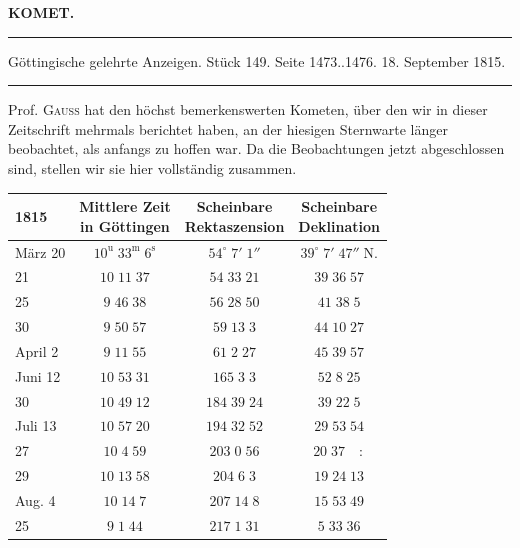 \clearpage{}\hypertarget{native-394-lower}{}\label{native-394-lower}
\begin{center}\textbf{KOMET.}\par\vspace{4pt}\hrule\vspace{4pt}\fontsize{10}{12}\selectfont Göttingische gelehrte Anzeigen. Stück 149. Seite 1473..1476. 18. September 1815.\par\vspace{4pt}\hrule\vspace{4pt}\end{center}

\par\indent Prof. \textsc{Gauss} hat den höchst bemerkenswerten Kometen, über den wir in dieser Zeitschrift mehrmals berichtet haben, an der hiesigen Sternwarte länger beobachtet, als anfangs zu hoffen war. Da die Beobachtungen jetzt abgeschlossen sind, stellen wir sie hier vollständig zusammen.

\begin{center}\fontsize{10}{12}\selectfont\setlength{\tabcolsep}{5pt}\renewcommand{\arraystretch}{1.15}\begin{tabular}{l|c|c|c}
1815 & \shortstack{Mittlere Zeit\\in Göttingen} & \shortstack{Scheinbare\\Rektaszension} & \shortstack{Scheinbare\\Deklination}\\\hline
März 20 & $10^{\mathrm u}\;33^{\mathrm m}\;6^{\mathrm s}$ & $54^\circ\;7'\;1''$ & $39^\circ\;7'\;47''\;\mathrm{N.}$\\
21 & $10\;11\;37$ & $54\;33\;21$ & $39\;36\;57$\\
25 & $9\;46\;38$ & $56\;28\;50$ & $41\;38\;5$\\
30 & $9\;50\;57$ & $59\;13\;3$ & $44\;10\;27$\\
April 2 & $9\;11\;55$ & $61\;2\;27$ & $45\;39\;57$\\
Juni 12 & $10\;53\;31$ & $165\;3\;3$ & $52\;8\;25$\\
30 & $10\;49\;12$ & $184\;39\;24$ & $39\;22\;5$\\
Juli 13 & $10\;57\;20$ & $194\;32\;52$ & $29\;53\;54$\\
27 & $10\;4\;59$ & $203\;0\;56$ & $20\;37\quad:$\\
29 & $10\;13\;58$ & $204\;6\;3$ & $19\;24\;13$\\
Aug. 4 & $10\;14\;7$ & $207\;14\;8$ & $15\;53\;49$\\
25 & $9\;1\;44$ & $217\;1\;31$ & $5\;33\;36$\\
\end{tabular}\end{center}

